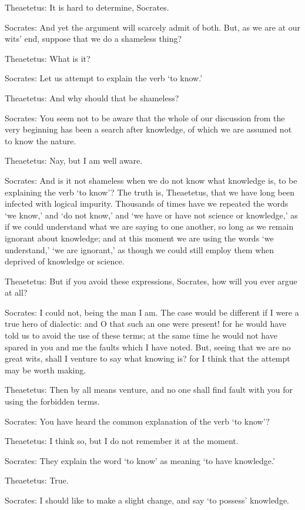 Theaetetus: It is hard to determine, Socrates.

Socrates: And yet the argument will scarcely admit of both. But, as we
are at our wits' end, suppose that we do a shameless thing?

Theaetetus: What is it?

Socrates: Let us attempt to explain the verb `to know.'

Theaetetus: And why should that be shameless?

Socrates: You seem not to be aware that the whole of our discussion from
the very beginning has been a search after knowledge, of which we are
assumed not to know the nature.

Theaetetus: Nay, but I am well aware.

Socrates: And is it not shameless when we do not know what knowledge is,
to be explaining the verb `to know'? The truth is, Theaetetus, that we
have long been infected with logical impurity. Thousands of times have
we repeated the words `we know,' and `do not know,' and `we have or have
not science or knowledge,' as if we could understand what we are saying
to one another, so long as we remain ignorant about knowledge; and at
this moment we are using the words `we understand,' `we are ignorant,'
as though we could still employ them when deprived of knowledge or
science.

Theaetetus: But if you avoid these expressions, Socrates, how will you
ever argue at all?

Socrates: I could not, being the man I am. The case would be different
if I were a true hero of dialectic: and O that such an one were present!
for he would have told us to avoid the use of these terms; at the same
time he would not have spared in you and me the faults which I have
noted. But, seeing that we are no great wits, shall I venture to say
what knowing is? for I think that the attempt may be worth making.

Theaetetus: Then by all means venture, and no one shall find fault with
you for using the forbidden terms.

Socrates: You have heard the common explanation of the verb `to know'?

Theaetetus: I think so, but I do not remember it at the moment.

Socrates: They explain the word `to know' as meaning `to have
knowledge.'

Theaetetus: True.

Socrates: I should like to make a slight change, and say `to possess'
knowledge.

